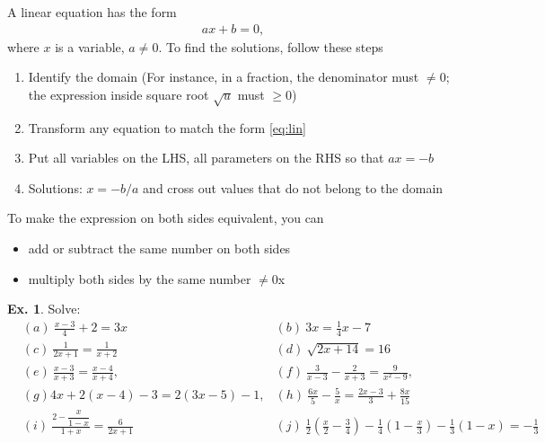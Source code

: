 \documentclass[10pt,a4paper]{book}
\theoremstyle{definition}\newtheorem{definition}{Definition}
\theoremstyle{definition}\newtheorem{fact}{Fact}
\theoremstyle{definition}\newtheorem{ex}{Ex.}
\theoremstyle{definition}\newtheorem{project}{Project}
\theoremstyle{definition}\newtheorem{problem}{Problem}
\theoremstyle{definition}\newtheorem{example}{Example}
\numberwithin{theorem}{chapter}
\numberwithin{corollary}{chapter}
\numberwithin{assumption}{chapter}
\numberwithin{definition}{chapter}
\numberwithin{prop}{chapter}
\numberwithin{notation}{chapter}
\numberwithin{problem}{chapter}
\numberwithin{example}{chapter}
\numberwithin{fact}{chapter}
\numberwithin{ex}{chapter}
\begin{document}
	A linear equation has the form
	\begin{align}
		ax + b = 0, \label{eq:lin} 
	\end{align}
	where $x$ is a variable, $a\neq 0$. To find the solutions, follow these steps
	\begin{enumerate}
		\item Identify the domain (For instance, in a fraction, the denominator must $\neq 0$; the expression inside square root $\sqrt{u}$ must $\geq 0$)
		\item Transform any equation to match the form \eqref{eq:lin}
		\item Put all variables on the LHS, all parameters on the RHS so that $ax = -b$
		\item Solutions: $x = -b/a$ and cross out values that do not belong to the domain
	\end{enumerate}
	To make the expression on both sides equivalent, you can
	\begin{itemize}
		\item add or subtract the same number on both sides
		\item multiply both sides by the same number $\neq 0$x
	\end{itemize}
	
	\begin{ex}
		Solve:
		\begin{align*}
			& (a) \ \frac{x-3}{4} + 2 = 3x                          & (b) \ 3x = \frac{1}{4}x - 7                                                                                                          \\
			& (c) \ \frac{1}{2x+1} = \frac{1}{x+2}                  & (d) \ \sqrt{2x+14} = 16                                                                                                              \\
			& (e) \ \frac{x-3}{x+3} = \frac{x-4}{x+4},              & (f) \ \frac{3}{x-3} - \frac{2}{x+3} = \frac{9}{x^2 - 9},                                                                             \\
			& (g) 4x + 2(x-4) - 3 = 2(3x-5) - 1,                    & (h) \ \frac{6x}{5} - \frac{5}{x} = \frac{2x-3}{3} + \frac{8x}{15}                                                                    \\
			& (i) \ \frac{2 - \dfrac{x}{1-x}}{1+x} = \frac{6}{2x+1} & (j) \ \frac{1}{2} \left( \frac{x}{2} - \frac{3}{4} \right) - \frac{1}{4}\left(1-\frac{x}{3}\right) - \frac{1}{3}(1-x) = -\frac{1}{3} 
		\end{align*}	
	\end{ex}
	
\end{document}
